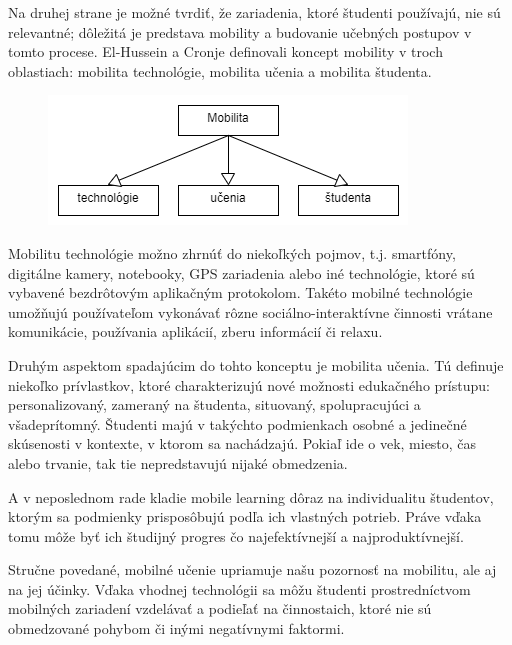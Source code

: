 \documentclass[10pt,oneside,slovak,a4paper]{article}
\begin{document}
Na druhej strane je možné tvrdiť, že zariadenia, ktoré študenti používajú, nie sú relevantné; dôležitá je predstava mobility a budovanie učebných postupov v tomto procese\cite{KukulskaHulme2009}. El-Hussein a Cronje\cite{Hussein} definovali koncept mobility v troch oblastiach: mobilita technológie, mobilita učenia a mobilita študenta\cite{Kim2012}.

\begin{figure}[htp]
	\centering
 	\includegraphics[scale=0.5]{diagram.png}
\end{figure}

Mobilitu technológie možno zhrnúť do niekoľkých pojmov, t.j. smartfóny, digitálne kamery, notebooky, GPS zariadenia alebo iné technológie, ktoré sú vybavené bezdrôtovým aplikačným protokolom. Takéto mobilné technológie umožňujú používateľom vykonávať rôzne sociálno-interaktívne činnosti vrátane komunikácie, používania aplikácií, zberu informácií či relaxu\cite{Kim2012}.

Druhým aspektom spadajúcim do tohto konceptu je mobilita učenia. Tú definuje niekoľko prívlastkov, ktoré charakterizujú nové možnosti edukačného prístupu: personalizovaný, zameraný na študenta, situovaný, spolupracujúci a všadeprítomný. Študenti majú v takýchto podmienkach osobné a jedinečné skúsenosti v kontexte, v ktorom sa nachádzajú. Pokiaľ ide o vek, miesto, čas alebo trvanie, tak tie nepredstavujú nijaké obmedzenia\cite{Kim2012}. 

A v neposlednom rade kladie mobile learning dôraz na individualitu študentov, ktorým sa podmienky prisposôbujú podľa ich vlastných potrieb. Práve vďaka tomu môže byť ich študijný progres čo najefektívnejší a najproduktívnejší.

Stručne povedané, mobilné učenie upriamuje našu pozornosť na mobilitu, ale aj na jej účinky. Vďaka vhodnej technológii sa môžu študenti prostredníctvom mobilných zariadení vzdelávať a podieľať na činnostaich, ktoré nie sú obmedzované pohybom či inými negatívnymi faktormi.

\end{document}
